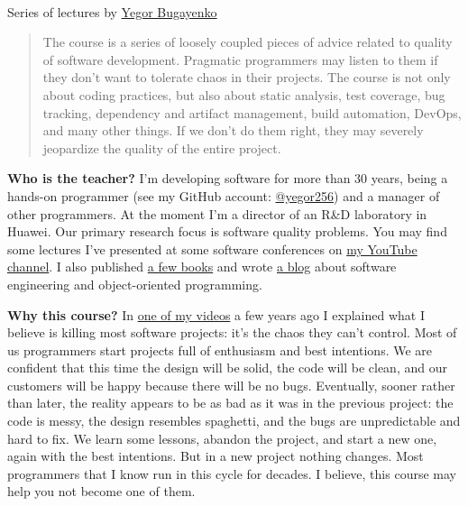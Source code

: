 \documentclass[nobrand,anonymous,nodate,nosecurity]{huawei}
\begin{document}
{\\
Series of lectures by \href{https://www.yegor256.com}{Yegor Bugayenko}


\begin{abstract}
The course is a series of loosely coupled pieces of advice related to quality of software development.
Pragmatic programmers may listen to them if they don't want
to tolerate chaos in their projects. The course is not only about
coding practices, but also about static analysis, test coverage,
bug tracking, dependency and artifact management, build automation,
DevOps, and many other things. If we don't do them right, they may
severely jeopardize the quality of the entire project.
\end{abstract}


\textbf{Who is the teacher?}
I'm developing software for more than 30 years, being a hands-on programmer
(see my GitHub account: \href{https://github.com/yegor256}{@yegor256})
and a manager of other programmers. At the moment I'm a director
of an R\&D laboratory in Huawei. Our primary research focus is
software quality problems. You may find some lectures I've presented
at some software conferences on
\href{https://www.youtube.com/channel/UCr9qCdqXLm2SU0BIs6d_68Q}{my YouTube channel}.
I also published \href{https://www.yegor256.com/books.html}{a few books}
and wrote \href{https://www.yegor256.com/contents.html}{a blog} about software engineering
and object-oriented programming.

\textbf{Why this course?}
In \href{https://www.youtube.com/watch?v=kPmbRkSWYnY}{one of my videos}
a few years ago I explained what I believe is killing
most software projects: it's the chaos they can't control. Most of us
programmers start projects full of enthusiasm and best intentions.
We are confident that this time the design will be solid, the code will
be clean, and our customers will be happy because there will be no bugs.
Eventually, sooner rather than later, the reality appears to be as bad
as it was in the previous project: the code is messy, the design resembles
spaghetti, and the bugs are unpredictable and hard to fix. We learn some
lessons, abandon the project, and start a new one, again with the best
intentions. But in a new project nothing changes.
Most programmers that I know run in this cycle for decades.
I believe, this course may help you not become one of them.

}
\end{document}
